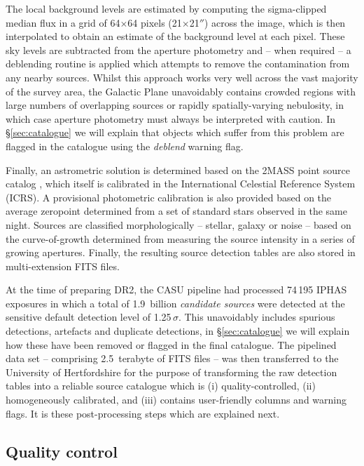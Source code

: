 \documentclass[useAMS,usenatbib]{mn2e}
\def\arcsec{$''$}
\begin{document}
The local background levels are estimated 
by computing the sigma-clipped median
flux in a grid of 64$\times$64 pixels (21$\times$21\arcsec)
across the image,
which is then interpolated to obtain an estimate 
of the background level at each pixel.
These sky levels are subtracted from the aperture photometry and
-- when required --
a deblending routine is applied which attempts to remove
the contamination from any nearby sources.
Whilst this approach works very well 
across the vast majority of the survey area,
the Galactic Plane unavoidably contains crowded regions 
with large numbers of overlapping sources
or rapidly spatially-varying nebulosity,
in which case aperture photometry must always be interpreted 
with caution.
In \S\ref{sec:catalogue} we will explain that objects
which suffer from this problem 
are flagged in the catalogue using the \emph{deblend} warning flag.

Finally, an astrometric solution is determined
based on the 2MASS point source catalog \citep{Skrutskie2006},
which itself is calibrated 
in the International Celestial Reference System (ICRS).
A provisional photometric calibration is also provided 
based on the average zeropoint
determined from a set of standard stars observed in the same night.
Sources are classified morphologically
-- stellar, galaxy or noise --
based on the curve-of-growth determined
from measuring the source intensity in a series of growing apertures.
Finally, the resulting source detection tables are also stored 
in multi-extension FITS files.

At the time of preparing DR2,
the CASU pipeline had processed
74\,195 IPHAS exposures 
in which a total of 1.9~billion \emph{candidate sources} were detected 
at the sensitive default detection level of 1.25\,$\sigma$.
This unavoidably includes spurious detections, artefacts and
duplicate detections,
in \S\ref{sec:catalogue} we will explain
how these have been removed or flagged in the final catalogue.
The pipelined data set -- comprising 2.5~terabyte of FITS files --
was then transferred to the University of Hertfordshire
for the purpose of transforming the raw
detection tables into a reliable source catalogue which is 
(i) quality-controlled,
(ii) homogeneously calibrated, and 
(iii) contains user-friendly columns and warning flags.
It is these post-processing steps which are explained next.


\subsection{Quality control}
\label{sec:qc}
\end{document}
